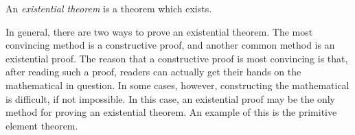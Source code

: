 \documentclass[12pt]{article}
\begin{document}
An \emph{existential theorem} is a theorem which  exists.

In general, there are two ways to prove an existential theorem.  The most convincing method is a constructive proof, and another common method is an existential proof.  The reason that a constructive proof is most convincing is that, after reading such a proof, readers can actually get their hands on the mathematical  in question.  In some cases, however, constructing the mathematical  is difficult, if not impossible.  In this case, an existential proof may be the only  method for proving an existential theorem.  An example of this is the primitive element theorem.
\end{document}
